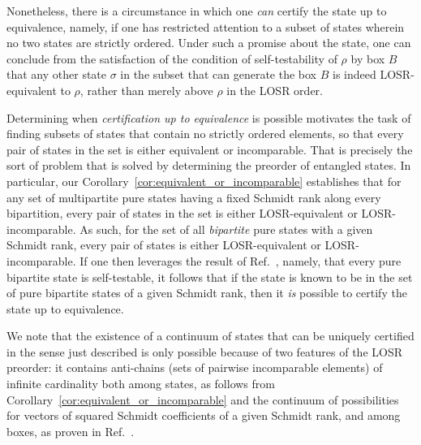 \documentclass[prx,11pt,letterpaper,twocolumn,accepted=2023-11-27]{quantumarticle}
\theoremstyle{plain}
\theoremstyle{definition}
\begin{document}
\begin{appendices}
Nonetheless, there is a circumstance in which one {\em can} certify the state up to equivalence, namely, if one has restricted  attention to a subset of states wherein no two states are strictly ordered.   Under such a promise about the state, one can conclude from the satisfaction of the condition of self-testability of $\rho$ by box $B$ that any other state $\sigma$ in the subset that can generate the box $B$ is indeed LOSR-equivalent to $\rho$, rather than merely above $\rho$ in the LOSR order.

Determining when {\em certification up to equivalence} is possible motivates the task of finding  subsets of states that contain no strictly ordered elements, so that every pair of states in the set is either equivalent or incomparable. 
 That is precisely the sort of problem that is solved by determining the preorder of entangled states.  
In particular, our Corollary~\ref{cor:equivalent_or_incomparable} establishes that for any set of multipartite pure states having a fixed Schmidt rank along every bipartition, every pair of states in the set is either LOSR-equivalent or LOSR-incomparable.  As such, for the set of all {\em bipartite} pure states with a given Schmidt rank, every pair of states is either LOSR-equivalent or LOSR-incomparable.  If one then leverages the result of Ref.~\cite{Coladangelo2017}, namely, that every pure bipartite state is self-testable, it follows that if the state is known to be in the set of  pure bipartite states of a given Schmidt rank, then it {\em is} possible to certify the state up to equivalence.

We note that the existence of a continuum of states that can be uniquely certified in the sense just described is only possible because of two features of the LOSR preorder: it contains anti-chains (sets of pairwise incomparable elements) of infinite cardinality both among states, as follows from Corollary~\ref{cor:equivalent_or_incomparable} and the continuum of possibilities for vectors of squared Schmidt coefficients of a given Schmidt rank, and among boxes, as proven in Ref.~\cite{wolfe2020quantifying}.   


\end{appendices}
\end{document}
